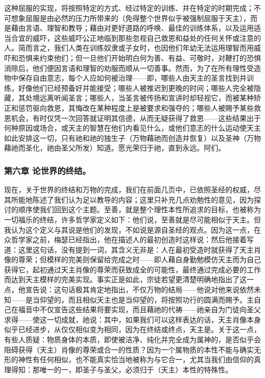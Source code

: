 这种屈服的实现，将按照特定的方式、经过特定的训练、并在特定的时期完成；不可想象屈服是由必然的压力所带来的（免得整个世界似乎被强制屈服于天主），而是藉由言语、理智和教导；藉由对更好道路的呼唤、最佳的训练体系，以及运用适当合宜的威吓，这些威吓公正地临到那些忽视自己救恩和益处的任何关怀或注意的人。简而言之，我们人类在训练奴隶或子女时，也因他们年幼无法运用理智而用威吓和恐惧来约束他们；但一旦他们开始明白何为善、有益、可敬时，对鞭打的恐惧消除后，他们便因言语和理智的劝服而顺从一切善事。然而，为了在所有理性受造物中保存自由意志，每个人应如何被治理——即，哪些人由天主的圣言找到并训练，好像他们已经预备好并能接受；哪些人被推迟到更晚的时间；哪些人完全被隐藏，其处境远离听闻圣言；哪些人，当圣言被传扬和宣讲时却轻视它，而被某种矫正和惩罚驱向救恩，其悔改在某种程度上是被要求和强夺的；哪些人被赐予某些救恩机会，有时仅凭一次回答就证明其信德，从而无疑获得了救恩——这些结果出于何种原因或场合，或天主的智慧在他们内看见什么，或他们意志的什么运动使天主如此安排这一切，只有祂和祂的独生子（万物藉祂而创造并恢复）以及圣神（万物藉祂而圣化，祂由圣父所发）知道。愿光荣归于祂，直到永远。阿们。\par


\subsubsection{第六章 论世界的终结。}

现在，关于世界的终结和万物的完成，我们在前面几页中，已依照圣经的权威，尽其所能地陈述了我们认为足以教导的内容；这里只补充几点劝勉性的意见，因为探讨的顺序使我们回到这个主题。至善，就是整个理性本性所追求的目标，也被称为一切福乐的终结，许多哲学家定义如下：他们说，至善就是尽可能相似于天主。但我认为这个定义与其说是他们的发现，不如说是源自圣经的观点。因为这一点，在众哲学家之前，梅瑟已经指出，他在描述人的最初创造时这样说：然后他接着写道：这里这句话，没有提到一词，其含义无非是：人在最初受造时就获得了天主肖像的尊荣；但模样的完美则保留给完成之时——即人藉自身勤勉模仿天主而为自己获得它，起初通过天主肖像的尊荣而获致成全的可能性，最终通过完成必要的工作而达到天主模样的完美实现。事实正是如此，宗徒若望更清楚明确地指出了这一点，他宣告说：这句话极其肯定地指出，不仅万物的结局——他说对他来说依然未知——是当仰望的，而且相似天主也是当仰望的，将按照功行的圆满而赐予。主自己在福音中不仅宣告这些结果将要实现，而且藉祂的代祷——祂亲自为门徒向圣父求得——使这一切成就，祂说：其中，如果我们可以这样表达的话，天主肖像本身似乎已经进步，从仅仅相似变为相同，因为在终结或终点，天主是。关于这一点，有些人质疑：物质身体的本质，即使被洁净、纯化并完全成为属神的，是否似乎会阻碍获得（天主）肖像的尊荣或合一的性质？因为一个属物质的本性不能与确实无形的神性有任何相似，也不能真实恰当地被称为与它合一，尤其当我们由信仰的真理得知：那唯一的一，即圣子与圣父，必须归于（天主）本性的特殊性。\par

